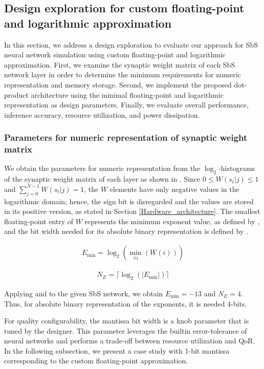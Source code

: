 \subsection{Design exploration for custom floating-point and logarithmic approximation}

In this section, we address a design exploration to evaluate our approach for SbS neural network simulation using custom floating-point and logarithmic approximation. First, we examine the synaptic weight matrix of each SbS network layer in order to determine the minimum requirements for numeric representation and memory storage. Second, we implement the proposed dot-product architecture using the minimal floating-point and logarithmic representation as design parameters. Finally, we evaluate overall performance, inference accuracy, resource utilization, and power dissipation.

\subsubsection{Parameters for numeric representation of synaptic weight matrix}

We obtain the parameters for numeric representation from the $\log_2$-histograms of the synaptic weight matrix of each layer as shown in . Since $0\le W(s_t|j)\le1$ and $\sum_{j=0}^{N-1}W(s_t|j)=1$, the $W$ elements have only negative values in the logarithmic domain; hence, the sign bit is disregarded and the values are stored in its positive version, as stated in Section \ref{Hardware_architecture}. The smallest floating-point entry of $W$ represents the minimum exponent value, as defined by , and the bit width needed for its absolute binary representation is defined by .

\begin{eqnarray} \label{eq:exp_max}
E_{\min}=\log _2(\min_{\forall i}(W(i)))
\end{eqnarray}

\begin{eqnarray} \label{eq:bits_exp}
N_E=\lceil\log_2(|E_{\min}|)\rceil
\end{eqnarray}

Applying  and  to the given SbS network, we obtain $E_{\min}=-13$ and $N_E=4$. Thus, for absolute binary representation of the exponents, it is needed 4-bits.

For quality configurability, the mantissa bit width is a knob parameter that is tuned by the designer. This parameter leverages the builtin error-tolerance of neural networks and performs a trade-off between resource utilization and QoR. In the following subsection, we present a case study with 1-bit mantissa corresponding to the custom floating-point approximation.

